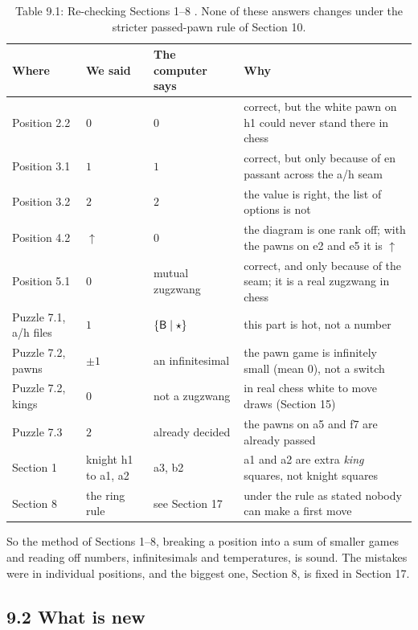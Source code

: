 \begin{table}[h]
\centering\small
\begin{tabularx}{\textwidth}{@{}l l l X@{}}
\toprule
Where & We said & The computer says & Why \\
\midrule
Position 2.2 & $0$ & $0$ & correct, but the white pawn on h1 could never stand there in chess \\
Position 3.1 & $1$ & $1$ & correct, but only because of en passant across the a/h seam \\
Position 3.2 & $2$ & $2$ & the value is right, the list of options is not \\
Position 4.2 & $\uparrow$ & $0$ & the diagram is one rank off; with the pawns on e2 and e5 it is $\uparrow$ \\
Position 5.1 & $0$ & mutual zugzwang & correct, and only because of the seam; it is a real zugzwang in chess \\
Puzzle 7.1, a/h files & $1$ & $\{\mathsf{B} \mid \star\}$ & this part is hot, not a number \\
Puzzle 7.2, pawns & $\pm1$ & an infinitesimal & the pawn game is infinitely small (mean 0), not a switch \\
Puzzle 7.2, kings & $0$ & not a zugzwang & in real chess white to move draws (Section 15) \\
Puzzle 7.3 & $2$ & already decided & the pawns on a5 and f7 are already passed \\
Section 1 & knight h1 to a1, a2 & a3, b2 & a1 and a2 are extra \emph{king} squares, not knight squares \\
Section 8 & the ring rule & see Section 17 & under the rule as stated nobody can make a first move \\
\bottomrule
\end{tabularx}
\caption*{Table 9.1: Re-checking Sections 1--8 \checkedtwo. None of these answers changes under the stricter
passed-pawn rule of Section 10.}
\end{table}

\indent So the method of Sections 1--8, breaking a position into a sum of smaller games and reading off
numbers, infinitesimals and temperatures, is sound. The mistakes were in individual positions, and the biggest
one, Section 8, is fixed in Section 17.

\subsection*{9.2 What is new}

